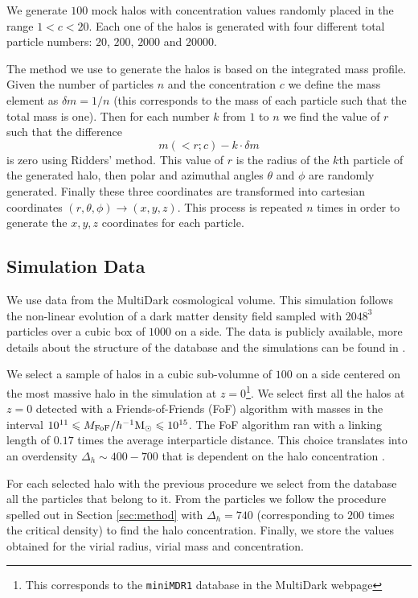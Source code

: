 \documentclass[useAMS,usenatbib]{mn2e}
\newcommand{\hMpc}{{\ifmmode{h^{-1}{\rm Mpc}}\else{$h^{-1}$Mpc }\fi}}
\newcommand{\hMsun}{{\ifmmode{h^{-1}{\rm
        {M_{\odot}}}}\else{$h^{-1}{\rm{M_{\odot}}}$~}\fi}}
\begin{document}
We generate $100$ mock halos with concentration values randomly
placed in the range $1<c<20$. Each one of the halos is generated with
four different total particle numbers: $20$, $200$, $2000$ and $20000$.

The method we use to generate the halos is based on the integrated
mass profile. Given the number of particles $n$ and the concentration
$c$ we define the mass element as $\delta m = 1/n$ (this corresponds
to the mass of each particle such that the total mass is one). Then
for each number $k$ from $1$ to $n$ we find the value of $r$ such that
the difference 
%
\begin{equation}
m(<r;c)-k \cdot \delta m 
\end{equation}
%
is zero using Ridders' method. This value of $r$ is the radius of
the $k$th particle of the generated halo, then polar and azimuthal
angles $\theta$ and $\phi$ are randomly generated. Finally these three
coordinates are transformed into cartesian coordinates
$(r,\theta,\phi) \rightarrow (x,y,z)$. This process is repeated $n$
times in order to generate the $x,y,z$ coordinates for each particle. 

\subsection{Simulation Data}
\label{sec:data}

We use data from the MultiDark cosmological volume. This simulation
follows the non-linear evolution of a dark matter density field
sampled with $2048^3$ particles over a cubic box of $1000$ \hMpc on a
side. The data is publicly available, more details about the structure
of the database and the simulations can be found in
\citep{2013AN....334..691R}. 

We select a sample of halos in a cubic sub-volumne of $100$ \hMpc on a
side centered on the most massive halo in the simulation at
$z=0$\footnote{This corresponds to the \texttt{miniMDR1} database in
  the MultiDark webpage}. We select first all the halos at $z=0$
detected with a Friends-of-Friends (FoF) algorithm with masses in the
interval $10^{11}\leq M_{\rm FoF}/\hMsun \leq 10^{15}$. The FoF
algorithm ran with a linking length of $0.17$ times the average
interparticle distance. This choice translates into an overdensity
$\Delta_h\sim 400-700$ that is dependent on the halo concentration
\citep{More2011}.

For each selected halo with the previous procedure we select from the database
all the particles that belong to it. From the particles we follow the
procedure spelled out in Section \ref{sec:method} with $\Delta_h=740$
(corresponding to $200$ times the critical density) to find the
halo concentration. Finally, we store the values obtained for the
virial radius, virial mass and concentration. 
\end{document}
